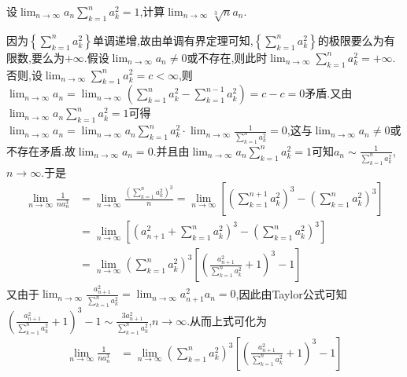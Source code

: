 \documentclass[../../main.tex]{subfiles}
\begin{document}
\begin{example}
设\(\lim_{n \to \infty} a_n \sum\limits_{k = 1}^{n} a_{k}^{2} = 1\),计算\(\lim_{n \to \infty} \sqrt[3]{n}a_n\).
\end{example}
\begin{solution}
因为\(\left\{\sum\limits_{k = 1}^n{a_{k}^{2}}\right\}\)单调递增,故由单调有界定理可知,\(\left\{\sum\limits_{k = 1}^n{a_{k}^{2}}\right\}\)的极限要么为有限数,要么为\(+\infty\).假设\(\lim_{n\rightarrow\infty}a_n\neq 0\)或不存在,则此时\(\lim_{n\rightarrow\infty}\sum\limits_{k = 1}^n{a_{k}^{2}}=+\infty\).否则,设\(\lim_{n\rightarrow\infty}\sum\limits_{k = 1}^n{a_{k}^{2}}=c <\infty\),则\(\lim_{n\rightarrow\infty}a_n=\lim_{n\rightarrow\infty}\left(\sum\limits_{k = 1}^n{a_{k}^{2}}-\sum\limits_{k = 1}^{n - 1}{a_{k}^{2}}\right)=c - c = 0\)矛盾.又由\(\lim_{n\rightarrow\infty}a_n\sum\limits_{k = 1}^n{a_{k}^{2}}=1\)可得\(\lim_{n\rightarrow\infty}a_n=\lim_{n\rightarrow\infty}a_n\sum\limits_{k = 1}^n{a_{k}^{2}}\cdot\lim_{n\rightarrow\infty}\frac{1}{\sum\limits_{k = 1}^n{a_{k}^{2}}}=0\),这与\(\lim_{n\rightarrow\infty}a_n\neq 0\)或不存在矛盾.故\(\lim_{n\rightarrow\infty}a_n = 0\).并且由\(\lim_{n\rightarrow\infty}a_n\sum\limits_{k = 1}^n{a_{k}^{2}}=1\)可知\(a_n\sim\frac{1}{\sum\limits_{k = 1}^n{a_{k}^{2}}}\),\(n\rightarrow\infty\).于是
\begin{align*}
\lim_{n\rightarrow\infty}\frac{1}{na_{n}^{3}}&=\lim_{n\rightarrow\infty}\frac{\left(\sum\limits_{k = 1}^n{a_{k}^{2}}\right)^3}{n}=\lim_{n\rightarrow\infty}\left[\left(\sum\limits_{k = 1}^{n + 1}{a_{k}^{2}}\right)^3-\left(\sum\limits_{k = 1}^n{a_{k}^{2}}\right)^3\right]\\
&=\lim_{n\rightarrow\infty}\left[\left(a_{n + 1}^{2}+\sum\limits_{k = 1}^n{a_{k}^{2}}\right)^3-\left(\sum\limits_{k = 1}^n{a_{k}^{2}}\right)^3\right]\\
&=\lim_{n\rightarrow\infty}\left(\sum\limits_{k = 1}^n{a_{k}^{2}}\right)^3\left[\left(\frac{a_{n + 1}^{2}}{\sum\limits_{k = 1}^n{a_{k}^{2}}}+1\right)^3 - 1\right]
\end{align*}
又由于\(\lim_{n\rightarrow\infty}\frac{a_{n + 1}^{2}}{\sum\limits_{k = 1}^n{a_{k}^{2}}}=\lim_{n\rightarrow\infty}a_{n + 1}^{2}a_n = 0\),因此由Taylor公式可知\(\left(\frac{a_{n + 1}^{2}}{\sum\limits_{k = 1}^n{a_{k}^{2}}}+1\right)^3 - 1\sim\frac{3a_{n + 1}^{2}}{\sum\limits_{k = 1}^n{a_{k}^{2}}}\),\(n\rightarrow\infty\).从而上式可化为
\begin{align*}
\lim_{n\rightarrow\infty}\frac{1}{na_{n}^{3}}&=\lim_{n\rightarrow\infty}\left(\sum\limits_{k = 1}^n{a_{k}^{2}}\right)^3\left[\left(\frac{a_{n + 1}^{2}}{\sum\limits_{k = 1}^n{a_{k}^{2}}}+1\right)^3 - 1\right]\\

\end{align*}
\end{solution}
\end{document}
